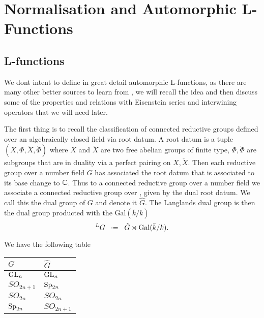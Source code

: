 \section{Normalisation and Automorphic L-Functions}
\subsection{L-functions}
We dont intent to define in great detail automorphic L-functions, as there are many other better sources to learn from \cite[Part 2.III.2]{borelAutomorphicFormsRepresentations1979}\cite{shahidiEisensteinSeriesAutomorphic2010}\cite{cogdellLFUNCTIONSFUNCTORIALITY}\cite[9, 10, 11]{bumpIntroductionLanglandsProgram2004}\cite{arthurLfunctionsAutomorphicRepresenta}, we will recall the idea and then discuss some of the properties and relations with Eisenstein series and interwining operators that we will need later.

The first thing is to recall the classification of connected reductive groups defined over an algebraically closed field via root datum. A root datum is a tuple \((X, \Phi, \check{X} , \check{\Phi})\) where \(X\) and \(\check{X}\) are two free abelian groups of finite type, \(\Phi, \check{\Phi}\) are subgroups that are in duality via a perfect pairing on \(X, \check{X}\). Then each reductive group over a number field \(G\) has associated the root datum that is associated to its base change to \(\C\). Thus to a connected reductive group over a number field we associate a connected reductive group over \C, given by the dual root datum. We call this the dual group of \(G\) and denote it \(\hat{G}\). The Langlands dual group is then the dual group producted with the \(\mathrm{Gal}(\bar{k}/k)\)
\[^L G \defeq \hat{G} \rtimes \mathrm{Gal}(\bar{k}/k).\]

\begin{example}
    We have the following table
    \begin{table}[h]
        \centering
        \begin{tabular}{ll}
        \(G\)         & \(\hat{G}\)   \\ \hline
        \(\operatorname{GL}_n\)     & \(\operatorname{GL}_n\)     \\
        \(SO_{2n+1}\) & \(\operatorname{Sp}_{2n}\)  \\
        \(SO_{2n}\)   & \(SO_{2n}\)   \\
        \(\operatorname{Sp}_{2n}\)  & \(SO_{2n+1}\)
        \end{tabular}
        \end{table}
\end{example}

